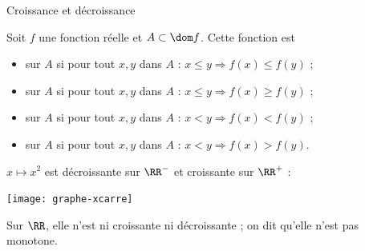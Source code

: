\documentclass[french,xcolor=svgnames]{beamer}
\begin{document}
\begin{frame}{Croissance et décroissance}
  \begin{definition}
    Soit \(f\) une fonction réelle et \(A \subset \dom f\).\pause{} Cette fonction est\pause{}
    \begin{itemize}[<+->]
    \item {} sur \(A\) si\pause{} pour tout \(x, y\) dans \(A\) : \(x \leq y \Rightarrow f(x) \leq f(y)\) ;\pause{}
    \item {} sur \(A\) si\pause{} pour tout \(x, y\) dans \(A\) : \(x \leq y \Rightarrow f(x) \geq f(y)\) ;\pause{}
    \item {} sur \(A\) si\pause{} pour tout \(x, y\) dans \(A\) : \(x < y \Rightarrow f(x) < f(y)\) ;\pause{}
    \item {} sur \(A\) si\pause{} pour tout \(x, y\) dans \(A\) : \(x < y \Rightarrow f(x) > f(y)\).
    \end{itemize}
  \end{definition}
\end{frame}
\begin{frame}
  \(x \mapsto x^{2}\) est décroissante sur \(\RR^{-}\) et croissante sur \(\RR^+\) :\pause{}
  \begin{center}
    \texttt{[image: graphe-xcarre]}
  \end{center}
  \pause Sur \(\RR\), elle n'est ni croissante ni décroissante\pause{} ; on dit qu'elle n'est pas monotone.
\end{frame}
\end{document}

